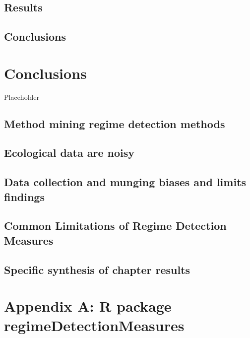 \documentclass[12pt,twoside,openany]{reedthesis}
\begin{document}
\section{Results}\label{results-3}

\section{Conclusions}\label{conclusions-1}

\chapter{Conclusions}\label{conclusions}

Placeholder

\section{Method mining regime detection
methods}\label{method-mining-regime-detection-methods}

\section{Ecological data are noisy}\label{ecological-data-are-noisy}

\section{Data collection and munging biases and limits
findings}\label{data-collection-and-munging-biases-and-limits-findings}

\section{Common Limitations of Regime Detection
Measures}\label{common-limitations-of-regime-detection-measures}

\section{Specific synthesis of chapter
results}\label{specific-synthesis-of-chapter-results}

\chapter*{Appendix A: R package
regimeDetectionMeasures}\label{regimeDetectionMeasures}
\end{document}
